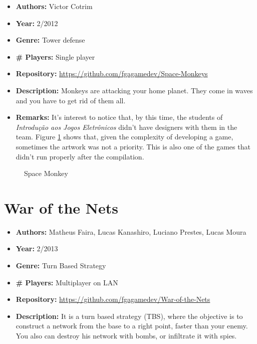 \begin{apendicesenv}
\begin{itemize}
\item[] \textbf{Authors:} Victor Cotrim
\item[] \textbf{Year:} 2/2012
\item[] \textbf{Genre:} Tower defense
\item[] \textbf{\# Players:} Single player
\item[] \textbf{Repository:} \url{https://github.com/fgagamedev/Space-Monkeys}
\item[] \textbf{Description:} Monkeys are attacking your home planet. They come in waves and you have to get rid of them all.
\item[] \textbf{Remarks:} It's interest to notice that, by this time, the students of \textit{Introdu\c{c}\~ao aos Jogos Eletr\^onicos} didn't have designers with them in the team. Figure \ref{fig:space_monkey} shows that, given the complexity of developing a game, sometimes the artwork was not a priority. This is also one of the games that didn't run properly after the compilation.
\end{itemize}


\begin{figure}[h!]
\centering
{}
\caption{Space Monkey}
\label{fig:space_monkey}
\end{figure}


\section{War of the Nets}
\label {sec:war}

\begin{itemize}
\item[] \textbf{Authors:} Matheus Faira, Lucas Kanashiro, Luciano Prestes, Lucas Moura
\item[] \textbf{Year:} 2/2013
\item[] \textbf{Genre:} Turn Based Strategy
\item[] \textbf{\# Players:} Multiplayer on LAN
\item[] \textbf{Repository:} \url{https://github.com/fgagamedev/War-of-the-Nets}
\item[] \textbf{Description:} It is a turn based strategy (TBS), where the objective is to construct a network from the base to a right point, faster than your enemy. You also can destroy his network with bombs, or infiltrate it with spies.

\end{itemize}


\end{apendicesenv}
